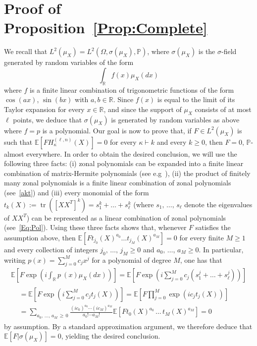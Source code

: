 \documentclass[AHL,Unicode,longabstracts,published]{cedram}
\DeclareMathOperator{\Tr}{tr}
\newcommand{\R}{\mathbb{R}}
\newcommand{\Prob}{\mathbb{P}}
\newcommand{\E}[1]{\mathbb{E}\left[#1\right]}
\begin{document}
\section{Proof of Proposition~\ref{Prop:Complete}}\label{App:Complete}
We recall that $L^2(\mu_X)=L^2(\Omega,\sigma(\mu_X),\Prob)$, where $\sigma(\mu_X)$ is the $\sigma$-field generated by random variables of the form
\[
\int_{\R} f(x) \mu_X(dx)
\]
where $f$ is a finite linear combination of trigonometric functions of the form $\cos(ax)$, $\sin(bx)$ with $a,b\in \R$. Since $f(x)$ is equal to the limit of its Taylor expansion for every $x\in \R$, and since the support of $\mu_X$ consists of at most $\ell$ points, we deduce that $\sigma(\mu_X)$ is generated by random variables as above where $f=p$ is a polynomial. Our goal is now to prove that, if $F \in L^2(\mu_X)$ is such that $\E{F H_{\kappa}^{(\ell,n)}(X)} = 0$ for every $\kappa\vdash k $ and every $k\geq 0$, then $F=0$, $\Prob$-almost everywhere. In order to obtain the desired conclusion, we will use the following three facts: (i) zonal polynomials can be expanded into a finite linear combination of matrix-Hermite polynomials (see e.g~\cite[Eq.~(4.12)]{Ch92}), (ii) the product of finitely many zonal polynomials is a finite linear combination of zonal polynomials (see~\eqref{akt}) and (iii) every monomial of the form $t_k(X):=\Tr([XX^T]^k)=s_1^{k}+\ldots+s_{\ell}^k$ (where $s_1,\,\ldots,\,s_{\ell}$ denote the eigenvalues of $XX^T$) can be represented as a linear combination of zonal polynomials (see~\eqref{Eq:Pol}). Using these three facts shows that, whenever $F$ satisfies the assumption above, then $\E{F t_{j_0}(X)^{a_0}\ldots t_{j_M}(X)^{a_M}}=0$ for every finite $M\geq 1$ and every collection of integers $j_0,\,\ldots,\,j_M\geq 0$ and $a_0,\,\ldots,\,a_M\geq 0$. In particular, writing $p(x) = \sum_{j=0}^M c_j x^j$ for a polynomial of degree $M$, one has that
\begin{multline*}
\E{F \exp\left(i \int_{\R} p~(x) \mu_X(dx)\right)} = \E{F \exp\left(i \sum_{j=0}^M c_j\left(s_1^j + \ldots+ s_{\ell}^j\right)\right)}\\
\begin{aligned}
&=\E{F \exp\left(i \sum_{j=0}^{M} c_j t_j(X)\right)}= \E{F \prod_{j=0}^M \exp\left(i c_j t_j(X)\right)}\\
&= \sum_{a_0,\,\ldots,\,a_M\,\geq\,0} \frac{(ic_0)^{a_0} \cdots (ic_M)^{a_M}}{a_0!\cdots a_M!}
\E{F t_{0}(X)^{a_0}\,\ldots\,t_M(X)^{a_M}} = 0
\end{aligned}
\end{multline*}
by assumption. By a standard approximation argument, we therefore deduce that $\E{F|\sigma(\mu_X)} = 0$, yielding the desired conclusion.




\end{document}
